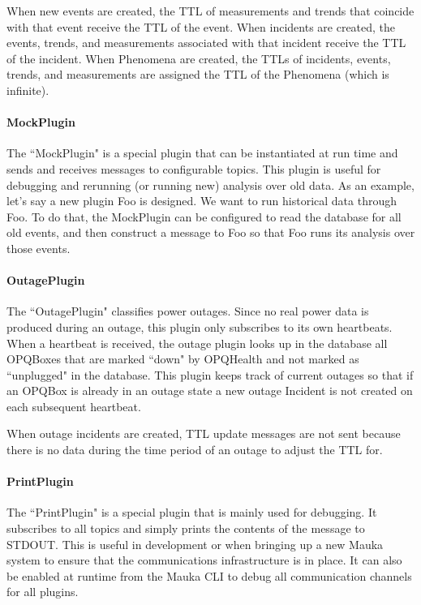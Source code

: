 When new events are created, the TTL of measurements and trends that coincide with that event receive the TTL of the event. When incidents are created, the events, trends, and measurements associated with that incident receive the TTL of the incident. When Phenomena are created, the TTLs of incidents, events, trends, and measurements are assigned the TTL of the Phenomena (which is infinite).

\paragraph{MockPlugin}
The ``MockPlugin" is a special plugin that can be instantiated at run time and sends and receives messages to configurable topics. This plugin is useful for debugging and rerunning (or running new) analysis over old data. As an example, let's say a new plugin Foo is designed. We want to run historical data through Foo. To do that, the MockPlugin can be configured to read the database for all old events, and then construct a message to Foo so that Foo runs its analysis over those events.

\paragraph{OutagePlugin}
The ``OutagePlugin" classifies power outages. Since no real power data is produced during an outage, this plugin only subscribes to its own heartbeats. When a heartbeat is received, the outage plugin looks up in the database all OPQBoxes that are marked ``down" by OPQHealth and not marked as ``unplugged" in the database. This plugin keeps track of current outages so that if an OPQBox is already in an outage state a new outage Incident is not created on each subsequent heartbeat.

When outage incidents are created, TTL update messages are not sent because there is no data during the time period of an outage to adjust the TTL for.

\paragraph{PrintPlugin}
The ``PrintPlugin" is a special plugin that is mainly used for debugging. It subscribes to all topics and simply prints the contents of the message to STDOUT. This is useful in development or when bringing up a new Mauka system to ensure that the communications infrastructure is in place. It can also be enabled at runtime from the Mauka CLI to debug all communication channels for all plugins.

